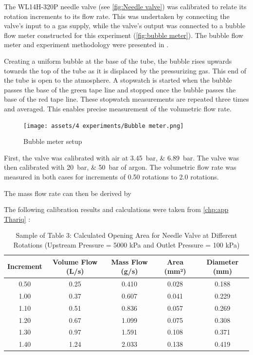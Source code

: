             The WL14H-320P needle valve (see \autoref{fig:Needle valve}) was calibrated to relate its rotation increments to its flow rate. This was undertaken by connecting the valve's input to a gas supply, while the valve's output was connected to a bubble flow meter constructed for this experiment (\autoref{fig:bubble meter}). The bubble flow meter and experiment methodology were presented in \textcite{barigouFluidMechanicsSoap1993}.

            Creating a uniform bubble at the base of the tube, the bubble rises upwards towards the top of the tube as it is displaced by the pressurizing gas. This end of the tube is open to the atmosphere. A stopwatch is started when the bubble passes the base of the green tape line and stopped once the bubble passes the base of the red tape line. These stopwatch measurements are repeated three times and averaged. This enables precise measurement of the volumetric flow rate.

            \begin{figure}[!ht]
                \centering
                \texttt{[image: assets/4 experiments/Bubble meter.png]}
                \caption{Bubble meter setup}
                \label{fig:bubble meter}
            \end{figure}

            First, the valve was calibrated with air at \qtylist{3.45;6.89}{bar}. The valve was then calibrated with \qtylist{20;50}{bar} of argon. The volumetric flow rate was measured in both cases for increments of 0.50 rotations to 2.0 rotations.

            The mass flow rate can then be derived by 

            The following calibration results and calculations were taken from \autoref{chp:app Thariq} :

            \begin{table}[!ht]
                \centering
                \caption{Sample of Table 3: Calculated Opening Area for Needle Valve at Different Rotations (Upstream Pressure = 5000 kPa and Outlet Pressure = 100 kPa)}
                \label{tab:opening_area}
                \begin{tabular}{|c|c|c|c|c|}
                \hline
                \textbf{Increment} & \textbf{Volume Flow (L/s)} & \textbf{Mass Flow (g/s)} & \textbf{Area (mm²)} & \textbf{Diameter (mm)} \\ \hline
                0.50 & 0.25 & 0.410 & 0.028 & 0.188 \\ \hline
                1.00 & 0.37 & 0.607 & 0.041 & 0.229 \\ \hline
                1.10 & 0.51 & 0.836 & 0.057 & 0.269 \\ \hline
                1.20 & 0.67 & 1.099 & 0.075 & 0.308 \\ \hline
                1.30 & 0.97 & 1.591 & 0.108 & 0.371 \\ \hline
                1.40 & 1.24 & 2.033 & 0.138 & 0.419 \\ \hline
                \end{tabular}
            \end{table}

